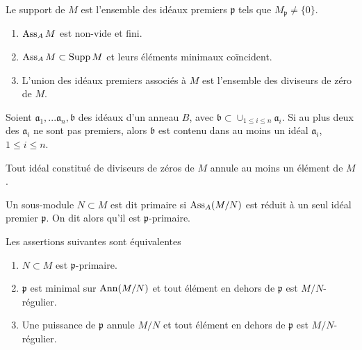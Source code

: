 \begin{defn}
Le support de $M$ est l'ensemble des idéaux premiers $\mathfrak{p}$ tels que $M_\mathfrak{p}\neq \lbrace 0\rbrace$.
\end{defn}

\begin{prop}\label{AssociatedPrimesProp1}
\begin{enumerate}
\item $\operatorname{Ass}_A M$ est non-vide et fini.
\item $\operatorname{Ass}_A M\subset \operatorname{Supp} M$ et leurs éléments minimaux coïncident.
\item L'union des idéaux premiers associés à $M$ est l'ensemble des diviseurs de zéro de $M$.
\end{enumerate}
\end{prop}

\begin{prop}
Soient $\mathfrak{a}_1,...\mathfrak{a}_n, \mathfrak{b}$ des idéaux d'un anneau $B$, avec $\mathfrak{b}\subset \cup_{1\leq i\leq n}\mathfrak{a}_i$. Si au plus deux des $\mathfrak{a}_i$ ne sont pas premiers, alors $\mathfrak{b}$ est contenu dans au moins un idéal $\mathfrak{a}_i$, $1\leq i\leq n$.
\end{prop}

\begin{cor}\label{AssociatedPrimesProp2}
Tout idéal constitué de diviseurs de zéros de $M$ annule au moins un élément de $M$.
\end{cor}

\begin{defn}
Un sous-module $N\subset M$ est dit primaire si $\operatorname{Ass}_A(M/N)$ est réduit à un seul idéal premier $\mathfrak{p}$. On dit alors qu'il est $\mathfrak{p}$-primaire.
\end{defn}

\begin{prop}
Les assertions suivantes sont équivalentes
\begin{enumerate}
\item $N\subset M$ est $\mathfrak{p}$-primaire.
\item $\mathfrak{p}$ est minimal sur $\operatorname{Ann}(M/N)$ et tout élément en dehors de $\mathfrak{p}$ est $M/N$-régulier.
\item Une puissance de $\mathfrak{p}$ annule $M/N$ et tout élément en dehors de $\mathfrak{p}$ est $M/N$-régulier.
\end{enumerate}
\end{prop}

